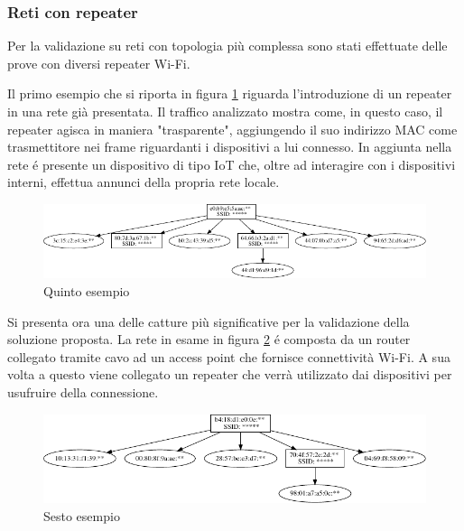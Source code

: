 
\newpage

\subsubsection{Reti con repeater}

Per la validazione su reti con topologia pi\`u complessa sono stati effettuate delle prove con diversi repeater Wi-Fi.

Il primo esempio che si riporta in figura \ref{fig:es5} riguarda l'introduzione di un repeater in una rete gi\`a presentata.
Il traffico analizzato mostra come, in questo caso, il repeater agisca in maniera "trasparente", aggiungendo il suo indirizzo MAC come trasmettitore nei frame riguardanti i dispositivi a lui connesso.
In aggiunta nella rete \'e presente un dispositivo di tipo IoT che, oltre ad interagire con i dispositivi interni, effettua annunci della propria rete locale.

\begin{figure}[!h]
	\centering
	\includegraphics{images/img12censored.pdf}
	\caption{Quinto esempio}
	\label{fig:es5}
\end{figure}


Si presenta ora una delle catture pi\`u significative per la validazione della soluzione proposta.
La rete in esame in figura \ref{fig:es6} \'e composta da un router collegato tramite cavo ad un access point che fornisce connettivit\`a Wi-Fi.
A sua volta a questo viene collegato un repeater che verr\`a utilizzato dai dispositivi per usufruire della connessione.

\begin{figure}[!h]
	\centering
	\includegraphics{images/img13censored.pdf}
	\caption{Sesto esempio}
	\label{fig:es6}
\end{figure}

